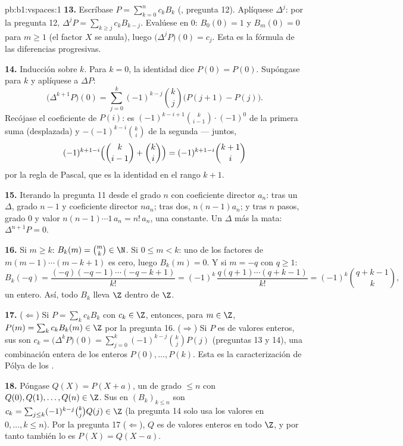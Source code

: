 \begin{solution}{pb:b1:vspaces:1}
\textbf{13.} Escríbase $P = \sum_{k=0}^{n} c_k B_k$ (,
pregunta 12). Aplíquese $\Delta^{j}$: por la pregunta 12,
$\Delta^{j} P = \sum_{k \geq j} c_k B_{k-j}$. Evalúese en $0$:
$B_0(0) = 1$ y $B_m(0) = 0$ para $m \geq 1$ (el factor $X$ se
anula), luego $\bigl(\Delta^{j}P\bigr)(0) = c_j$. Esta es la fórmula
de las diferencias progresivas.

\textbf{14.} Inducción sobre $k$. Para $k = 0$, la identidad dice
$P(0) = P(0)$. Supóngase para $k$ y aplíquese a $\Delta P$:
\[
\bigl(\Delta^{k+1} P\bigr)(0)
= \sum_{j=0}^{k} (-1)^{k-j}\binom kj \bigl(P(j+1) - P(j)\bigr).
\]
Recójase el coeficiente de $P(i)$: es
$(-1)^{k-i+1}\binom k{i-1}\cdot(-1)^{0}$ de la primera suma
(desplazada) y $-(-1)^{k-i}\binom ki$ de la segunda --- juntos,
\[
(-1)^{k+1-i}\Bigl(\binom k{i-1} + \binom ki\Bigr)
= (-1)^{k+1-i}\binom{k+1}i
\]
por la regla de Pascal, que es la identidad en el rango $k + 1$.

\textbf{15.} Iterando la pregunta 11 desde el grado $n$ con
coeficiente director $a_n$: tras un $\Delta$, grado $n-1$ y
coeficiente director $n a_n$; tras dos, $n(n-1)a_n$; y tras $n$
pasos, grado $0$ y valor $n(n-1)\cdots 1\, a_n = n!\,a_n$, una
constante. Un $\Delta$ más la mata: $\Delta^{n+1}P = 0$.

\textbf{16.} Si $m \geq k$: $B_k(m) = \binom mk \in \N$. Si
$0 \leq m < k$: uno de los factores de $m(m-1)\cdots(m-k+1)$ es
cero, luego $B_k(m) = 0$. Y si $m = -q$ con $q \geq 1$:
\[
B_k(-q) = \frac{(-q)(-q-1)\cdots(-q-k+1)}{k!}
= (-1)^k\,\frac{q(q+1)\cdots(q+k-1)}{k!}
= (-1)^k \binom{q+k-1}{k},
\]
un entero. Así, todo $B_k$ lleva $\Z$ dentro de $\Z$.

\textbf{17.} ($\Leftarrow$) Si $P = \sum_k c_k B_k$ con
$c_k \in \Z$, entonces, para $m \in \Z$,
$P(m) = \sum_k c_k B_k(m) \in \Z$ por la pregunta 16.
($\Rightarrow$) Si $P$ es de valores enteros, sus  son
$c_k = \bigl(\Delta^k P\bigr)(0) = \sum_{j=0}^k (-1)^{k-j}\binom kj
P(j)$ (preguntas 13 y 14), una combinación entera de los enteros
$P(0), \dots, P(k)$. Esta es la caracterización de Pólya de los
.

\textbf{18.} Póngase $Q(X) = P(X + a)$, un  de grado
$\leq n$ con $Q(0), Q(1), \dots, Q(n) \in \Z$. Sus  en
$(B_k)_{k \leq n}$ son
$c_k = \sum_{j \leq k}(-1)^{k-j}\binom kj Q(j) \in \Z$ (la
pregunta 14 solo usa los valores en $0, \dots, k \leq n$). Por la
pregunta 17 ($\Leftarrow$), $Q$ es de valores enteros en todo $\Z$, y
por tanto también lo es $P(X) = Q(X - a)$.


\end{solution}
